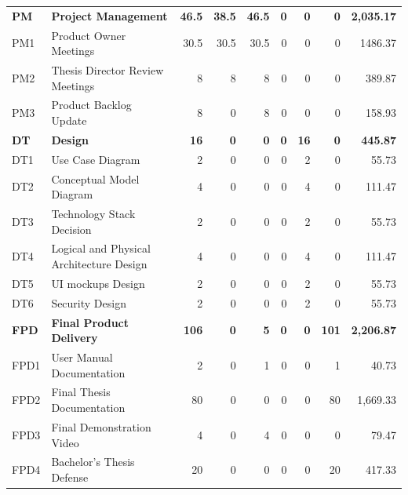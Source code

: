 \begin{longtable}{@{}l p{8.5cm} r r r r r r r@{}}
\rowcolor{gray!20}
\textbf{PM} & \textbf{Project Management} & \textbf{46.5} & \textbf{38.5} & \textbf{46.5} & \textbf{0} & \textbf{0} & \textbf{0} & \textbf{2,035.17} \\
\rowcolor{gray!05}
PM1 & Product Owner Meetings & 30.5 & 30.5 & 30.5 & 0 & 0 & 0 & 1486.37 \\  
\rowcolor{gray!05}
PM2 & Thesis Director Review Meetings & 8 & 8 & 8 & 0 & 0 & 0 & 389.87 \\
\rowcolor{gray!05}
PM3 & Product Backlog Update & 8 & 0 & 8 & 0 & 0 & 0 & 158.93 \\

\rowcolor{gray!20}
\textbf{DT} & \textbf{Design} & \textbf{16} & \textbf{0} & \textbf{0} & \textbf{0} & \textbf{16} & \textbf{0} & \textbf{445.87} \\
\rowcolor{gray!05}
DT1 & Use Case Diagram & 2 & 0 & 0 & 0 & 2 & 0 & 55.73 \\
\rowcolor{gray!05}
DT2 & Conceptual Model Diagram & 4 & 0 & 0 & 0 & 4 & 0 & 111.47 \\
\rowcolor{gray!05}
DT3 & Technology Stack Decision & 2 & 0 & 0 & 0 & 2 & 0 & 55.73 \\
\rowcolor{gray!05}
DT4 & Logical and Physical Architecture Design & 4 & 0 & 0 & 0 & 4 & 0 & 111.47 \\
\rowcolor{gray!05}
DT5 & UI mockups Design & 2 & 0 & 0 & 0 & 2 & 0 & 55.73 \\
\rowcolor{gray!05}
DT6 & Security Design & 2 & 0 & 0 & 0 & 2 & 0 & 55.73 \\
\rowcolor{gray!20}

\rowcolor{gray!20}
\textbf{FPD} & \textbf{Final Product Delivery} & \textbf{106} & \textbf{0} & \textbf{5} & \textbf{0} & \textbf{0} & \textbf{101} & \textbf{2,206.87} \\
\rowcolor{gray!05}
FPD1 & User Manual Documentation & 2 & 0 & 1 & 0 & 0 & 1 & 40.73 \\
\rowcolor{gray!05}
FPD2 & Final Thesis Documentation & 80 & 0 & 0 & 0 & 0 & 80 & 1,669.33 \\
\rowcolor{gray!05}
FPD3 & Final Demonstration Video & 4 & 0 & 4 & 0 & 0 & 0 & 79.47 \\
\rowcolor{gray!05}
FPD4 & Bachelor's Thesis Defense & 20 & 0 & 0 & 0 & 0 & 20 & 417.33 \\


\end{longtable}
